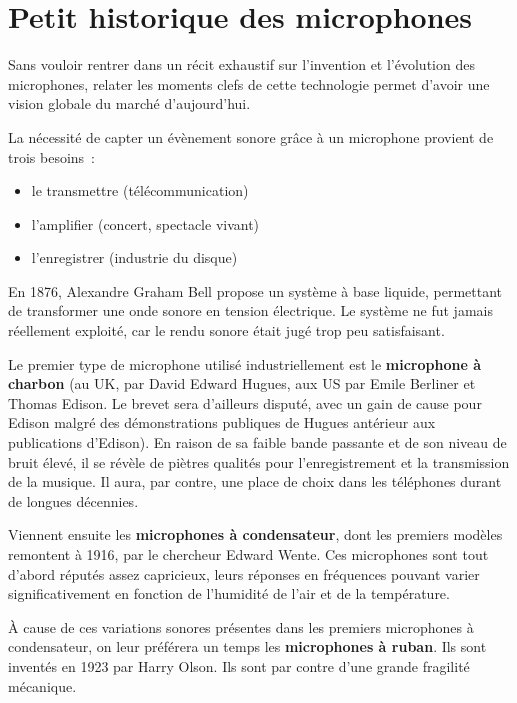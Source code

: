 \documentclass[
]{book}
\providecommand{\tightlist}{%
  \setlength{\itemsep}{0pt}\setlength{\parskip}{0pt}}
\begin{document}
\hypertarget{petit-historique-des-microphones}{%
\section{Petit historique des microphones}\label{petit-historique-des-microphones}}

Sans vouloir rentrer dans un récit exhaustif sur l'invention et l'évolution des microphones, relater les moments clefs de cette technologie permet d'avoir une vision globale du marché d'aujourd'hui.

La nécessité de capter un évènement sonore grâce à un microphone provient de trois besoins~:

\begin{itemize}
\tightlist
\item
  le transmettre (télécommunication)
\item
  l'amplifier (concert, spectacle vivant)
\item
  l'enregistrer (industrie du disque)
\end{itemize}

En 1876, Alexandre Graham Bell propose un système à base liquide, permettant de transformer une onde sonore en tension électrique. Le système ne fut jamais réellement exploité, car le rendu sonore était jugé trop peu satisfaisant.

Le premier type de microphone utilisé industriellement est le \textbf{microphone à charbon} (au UK, par David Edward Hugues, aux US par Emile Berliner et Thomas Edison. Le brevet sera d'ailleurs disputé, avec un gain de cause pour Edison malgré des démonstrations publiques de Hugues antérieur aux publications d'Edison). En raison de sa faible bande passante et de son niveau de bruit élevé, il se révèle de piètres qualités pour l'enregistrement et la transmission de la musique. Il aura, par contre, une place de choix dans les téléphones durant de longues décennies.

Viennent ensuite les \textbf{microphones à condensateur}, dont les premiers modèles remontent à 1916, par le chercheur Edward Wente. Ces microphones sont tout d'abord réputés assez capricieux, leurs réponses en fréquences pouvant varier significativement en fonction de l'humidité de l'air et de la température.

À cause de ces variations sonores présentes dans les premiers microphones à condensateur, on leur préférera un temps les \textbf{microphones à ruban}. Ils sont inventés en 1923 par Harry Olson. Ils sont par contre d'une grande fragilité mécanique.
\end{document}
